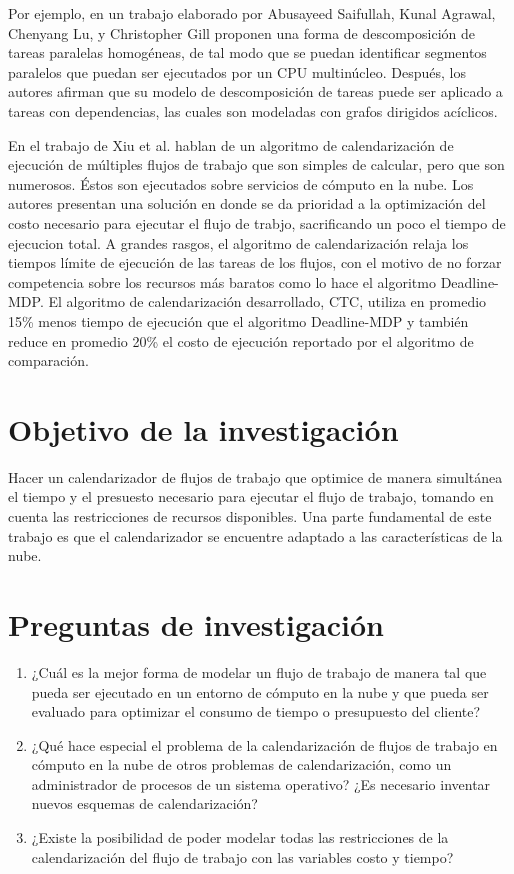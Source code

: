\documentclass[letterpaper]{report}
\begin{document}
Por ejemplo, en un trabajo elaborado por Abusayeed Saifullah, Kunal Agrawal, Chenyang Lu, y Christopher Gill \cite{saifullah2011multi} proponen una forma de descomposición de tareas paralelas homogéneas, de tal modo que se puedan identificar segmentos paralelos que puedan ser ejecutados por un CPU multinúcleo. Después, los autores afirman que su modelo de descomposición de tareas puede ser aplicado a tareas con dependencias, las cuales son modeladas con grafos dirigidos acíclicos.

En el trabajo de Xiu et al. \cite{liu2010compromised} hablan de un algoritmo de calendarización de ejecución de múltiples flujos de trabajo que son simples de calcular, pero que son numerosos. Éstos son ejecutados sobre servicios de cómputo en la nube. Los autores presentan una solución en donde se da prioridad a la optimización del costo necesario para ejecutar el flujo de trabjo, sacrificando un poco el tiempo de ejecucion total. A grandes rasgos, el algoritmo de calendarización relaja los tiempos límite de ejecución de las tareas de los flujos, con el motivo de no forzar competencia sobre los recursos más baratos como lo hace el algoritmo Deadline-MDP. El algoritmo de calendarización desarrollado, CTC, utiliza en promedio 15\% menos tiempo de ejecución que el algoritmo Deadline-MDP y también reduce en promedio 20\% el costo de ejecución reportado por el algoritmo de comparación.


\section*{Objetivo de la investigación}
Hacer un calendarizador de flujos de trabajo que optimice de manera simultánea el tiempo y el presuesto necesario para ejecutar el flujo de trabajo, tomando en cuenta las restricciones de recursos disponibles. Una parte fundamental de este trabajo es que el calendarizador se encuentre adaptado a las características de la nube.

\section*{Preguntas de investigación}
\begin{enumerate}
\item ¿Cuál es la mejor forma de modelar un flujo de trabajo de manera tal que pueda ser ejecutado en un entorno de cómputo en la nube y que pueda ser evaluado para optimizar el consumo de tiempo o presupuesto del cliente?
\item ¿Qué hace especial el problema de la calendarización de flujos de trabajo en cómputo en la nube de otros problemas de calendarización, como un administrador de procesos de un sistema operativo? ¿Es necesario inventar nuevos esquemas de calendarización?
\item ¿Existe la posibilidad de poder modelar todas las restricciones de la calendarización del flujo de trabajo con las variables costo y tiempo?
\end{enumerate}




\end{document}
